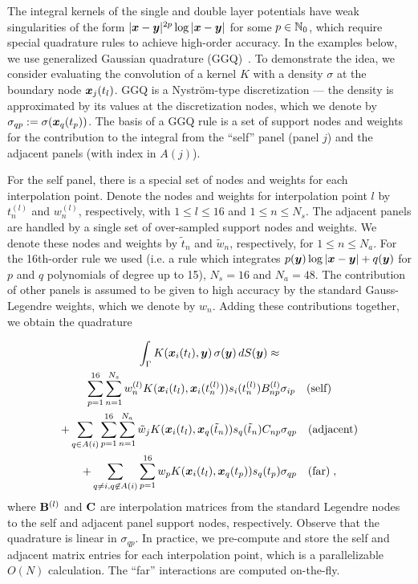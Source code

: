 The integral kernels of the single and
double layer potentials have weak
singularities of the form $|{\boldsymbol x}-{\boldsymbol y}|^{2p}\log |{\boldsymbol x}-{\boldsymbol y}|$
for some $p \in \mathbb{N}_0$, which require special
quadrature rules to achieve high-order accuracy.
%
In the examples below, we use generalized
Gaussian quadrature (GGQ)~\cite{bremer2010}.
%
To demonstrate the idea, we consider
evaluating the convolution of a kernel
$K$ with a density $\sigma$
at the boundary node ${\boldsymbol x}_j(t_l)$.
%
GGQ is a Nystr\"{o}m-type discretization ---
the density is approximated 
by its values at the discretization nodes,
which we denote by
$\sigma_{qp} := \sigma({\boldsymbol x}_q(t_p))$.
%
The basis of a GGQ rule is a set of 
support nodes and weights for the
contribution to the integral from the
``self'' panel (panel $j$) and the adjacent
panels (with index in $A(j)$).
%

For the self panel, there is a special set
of nodes and weights for each interpolation
point. Denote the nodes and weights
for interpolation point $l$ by $t^{(l)}_{n}$
and $w^{(l)}_{n}$, respectively, with
$1\leq l \leq 16$ and $1\leq n \leq N_s$.
%
The adjacent panels are handled by a single
set of over-sampled support nodes and weights.
We denote these nodes and weights
by $\tilde{t}_n$ and $\tilde{w}_n$, respectively,
for $1 \leq n \leq N_a$.
%
For the {\color{red} 16th-order} rule we used
{\color{red} (i.e. a rule which integrates
  $p({\boldsymbol y})\log|{\boldsymbol x}-{\boldsymbol y}| + q({\boldsymbol y})$ for $p$ and $q$
  polynomials of degree up to 15)}, $N_s = 16$ and
  $N_a = 48$. 
%
The contribution of other panels is assumed
to be given to high accuracy by the standard
Gauss-Legendre weights, which we denote
by $w_n$.
%
Adding these contributions together, we obtain the
quadrature

\begin{multline}
  \int_\Gamma K({\boldsymbol x}_i(t_l),{\boldsymbol y}) \, \sigma({\boldsymbol y})
  \, dS({\boldsymbol y}) \approx \\
  \sum_{p=1}^{16} \sum_{n=1}^{N_s}
  w^{(l)}_{n} K({\boldsymbol x}_i(t_l),{\boldsymbol x}_i({t}^{(l)}_{n}))
  s_i({t}^{(l)}_{n}) B^{(l)}_{np} \sigma_{ip} \quad \textrm{(self)}
  \\
  + \sum_{q\in A(i)} \sum_{p=1}^{16} \sum_{n=1}^{N_a}
  \tilde{w}_jK({\boldsymbol x}_i(t_l),{\boldsymbol x}_q(\tilde{t}_n)) s_q(\tilde{t}_n)
  C_{np} \sigma_{qp}
  \quad \textrm{(adjacent)} \\
  + \sum_{q\neq i, q\not\in A(i)} \sum_{p=1}^{16}
  w_p K({\boldsymbol x}_i(t_l),{\boldsymbol x}_q(t_p)) s_q(t_p)
  \sigma_{qp} \quad \textrm{(far)} \nonumber \; ,
\end{multline}
where ${\bf B}^{(l)}$ and ${\bf C}$ are interpolation
matrices from the standard Legendre nodes
to the self and adjacent panel support nodes,
respectively. Observe that the quadrature is
linear in $\sigma_{qp}$. In practice, we pre-compute
and store the self and adjacent matrix entries for each
interpolation point, which is a parallelizable
$O(N)$ calculation. The ``far'' interactions
are computed on-the-fly.

